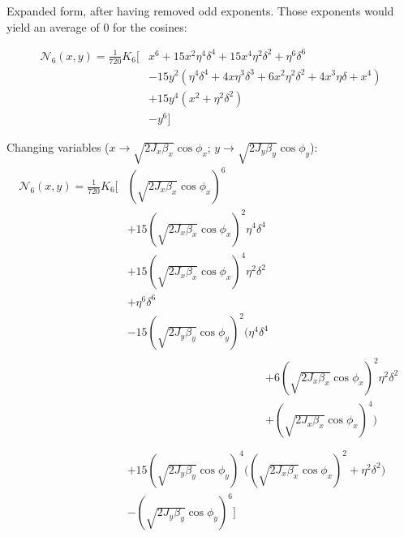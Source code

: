 Expanded form, after having removed odd exponents. Those exponents
would yield an average of \(0\) for the cosines:

\begin{equation}\begin{aligned}
  \mathcal{N_6}(x,y) = \frac{1}{720} K_6 
                                \biggl[
                                  &x^6 + 15x^2 \eta^4 \delta^4 + 15 x^4 \eta^2 \delta^2 + \eta^6 \delta^6 \\
                                  &-15y^2 (\eta^4 \delta^4 + 4x \eta^3 \delta^3 + 6x^2 \eta^2 \delta^2 + 4x^3 \eta \delta+ x^4) \\
                                  &+15y^4 (x^2 + \eta^2 \delta^2) \\
                                  &-y^6
                                \biggr]
\end{aligned}\end{equation}

Changing variables (\(x \rightarrow \sqrt{2 J_x \beta_x} \cos\phi_x\);
\(y \rightarrow \sqrt{2 J_y \beta_y} \cos\phi_y\)):
\begin{equation}\begin{aligned}
  \mathcal{N_6}(x,y) = \frac{1}{720} K_6 
                                \biggl[
                                  &\left(\sqrt{2 J_x \beta_x} \cos \phi_x\right)^6 \\
                                  &+ 15\left(\sqrt{2 J_x \beta_x} \cos \phi_x\right)^2 \eta^4 \delta^4 \\
                                  &+ 15 \left(\sqrt{2 J_x \beta_x} \cos \phi_x\right)^4 \eta^2 \delta^2 \\
                                  &+ \eta^6 \delta^6 \\
                                  &-15\left(\sqrt{2 J_y \beta_y} \cos \phi_y\right)^2 \bigg(\eta^4 \delta^4 \\
                                      &\;\begin{aligned}
                                      \phantom{-15\left(\sqrt{2 J_y \beta_y} \cos \phi_y\right)^2 \bigg(}
                                        &+ 6\left(\sqrt{2 J_x \beta_x} \cos \phi_x\right)^2 \eta^2 \delta^2 \\
                                        &+  \left(\sqrt{2 J_x \beta_x} \cos \phi_x\right)^4
                                      \biggr) \\
                                      \end{aligned} \\
                                  &+15\left(\sqrt{2 J_y \beta_y} \cos \phi_y\right)^4 \biggl(\left(\sqrt{2 J_x \beta_x} \cos \phi_x\right)^2 + \eta^2 \delta^2 \biggr) \\
                                  &-  \left(\sqrt{2 J_y \beta_y} \cos \phi_y\right)^6
                                \biggr]
\end{aligned}\end{equation}

